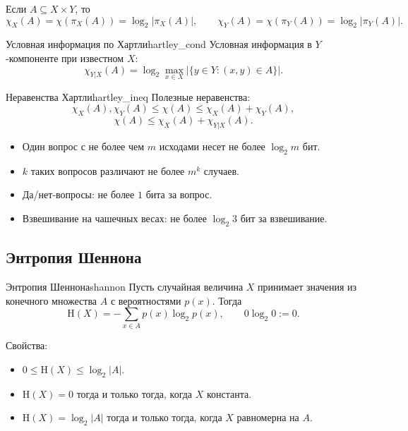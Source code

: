 \documentclass[12pt,a4paper]{article}
\renewcommand{\le}{\leqslant}
\newcommand{\HH}{\mathrm{H}}
\newcommand{\ChiH}{\chi}
\begin{document}
Если $A \subseteq X \times Y$, то
$$
\ChiH_X(A)=\ChiH(\pi_X(A))=\log_2 |\pi_X(A)|,
\qquad
\ChiH_Y(A)=\ChiH(\pi_Y(A))=\log_2 |\pi_Y(A)|.
$$

\begin{definition}{Условная информация по Хартли}{hartley_cond}
Условная информация в $Y$-компоненте при известном $X$:
$$
\ChiH_{Y|X}(A)=\log_2 \max_{x\in X} |\{y\in Y:(x,y)\in A\}|.
$$
\end{definition}

\begin{theorem}{Неравенства Хартли}{hartley_ineq}
Полезные неравенства:
$$
\ChiH_X(A),\ChiH_Y(A)\le \ChiH(A)\le \ChiH_X(A)+\ChiH_Y(A),
$$
$$
\ChiH(A)\le \ChiH_X(A)+\ChiH_{Y|X}(A).
$$
\end{theorem}

\begin{insight}
\begin{itemize}[leftmargin=1.5em]
    \item Один вопрос с не более чем $m$ исходами несет не более $\log_2 m$ бит.
    \item $k$ таких вопросов различают не более $m^k$ случаев.
    \item Да/нет-вопросы: не более $1$ бита за вопрос.
    \item Взвешивание на чашечных весах: не более $\log_2 3$ бит за взвешивание.
\end{itemize}
\end{insight}

\subsection{Энтропия Шеннона}

\begin{definition}{Энтропия Шеннона}{shannon}
Пусть случайная величина $X$ принимает значения из конечного множества $A$ с вероятностями $p(x)$. Тогда
$$
\HH(X)=-\sum_{x\in A} p(x)\log_2 p(x),
\qquad
0\log_2 0:=0.
$$
\end{definition}

Свойства:
\begin{itemize}[leftmargin=1.5em]
    \item $0\le \HH(X)\le \log_2 |A|$.
    \item $\HH(X)=0$ тогда и только тогда, когда $X$ константа.
    \item $\HH(X)=\log_2 |A|$ тогда и только тогда, когда $X$ равномерна на $A$.
\end{itemize}
\end{document}
